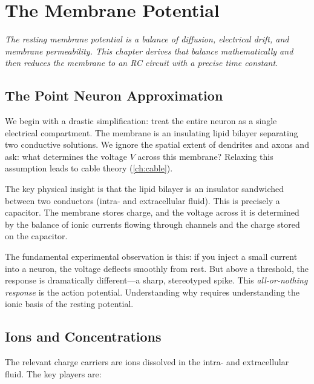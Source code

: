 \chapter{The Membrane Potential}
\label{ch:membrane}

\textit{The resting membrane potential is a balance of diffusion, electrical drift, and membrane permeability. This chapter derives that balance mathematically and then reduces the membrane to an RC circuit with a precise time constant.}

\section{The Point Neuron Approximation}
\label{sec:point-neuron}

We begin with a drastic simplification: treat the entire neuron as a single electrical compartment. The membrane is an insulating lipid bilayer separating two conductive solutions. We ignore the spatial extent of dendrites and axons and ask: what determines the voltage $V$ across this membrane? Relaxing this assumption leads to cable theory (\cref{ch:cable}).

The key physical insight is that the lipid bilayer is an insulator sandwiched between two conductors (intra- and extracellular fluid). This is precisely a capacitor. The membrane stores charge, and the voltage across it is determined by the balance of ionic currents flowing through channels and the charge stored on the capacitor.

The fundamental experimental observation is this: if you inject a small current into a neuron, the voltage deflects smoothly from rest. But above a threshold, the response is dramatically different---a sharp, stereotyped spike. This \emph{all-or-nothing response} is the action potential. Understanding why requires understanding the ionic basis of the resting potential.

\section{Ions and Concentrations}
\label{sec:ions}

The relevant charge carriers are ions dissolved in the intra- and extracellular fluid. The key players are:

